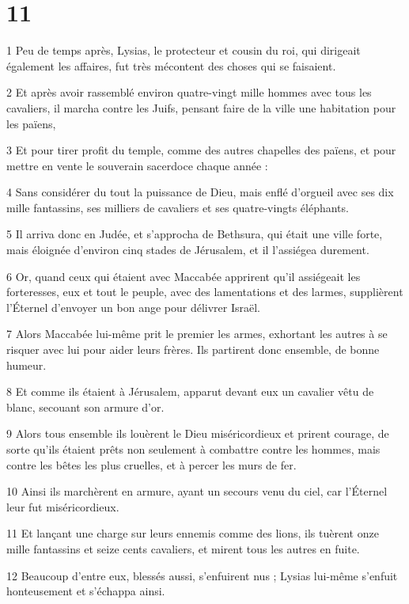 \chapter{11}

\par 1 Peu de temps après, Lysias, le protecteur et cousin du roi, qui dirigeait également les affaires, fut très mécontent des choses qui se faisaient.
\par 2 Et après avoir rassemblé environ quatre-vingt mille hommes avec tous les cavaliers, il marcha contre les Juifs, pensant faire de la ville une habitation pour les païens,
\par 3 Et pour tirer profit du temple, comme des autres chapelles des païens, et pour mettre en vente le souverain sacerdoce chaque année :
\par 4 Sans considérer du tout la puissance de Dieu, mais enflé d'orgueil avec ses dix mille fantassins, ses milliers de cavaliers et ses quatre-vingts éléphants.
\par 5 Il arriva donc en Judée, et s'approcha de Bethsura, qui était une ville forte, mais éloignée d'environ cinq stades de Jérusalem, et il l'assiégea durement.
\par 6 Or, quand ceux qui étaient avec Maccabée apprirent qu'il assiégeait les forteresses, eux et tout le peuple, avec des lamentations et des larmes, supplièrent l'Éternel d'envoyer un bon ange pour délivrer Israël.
\par 7 Alors Maccabée lui-même prit le premier les armes, exhortant les autres à se risquer avec lui pour aider leurs frères. Ils partirent donc ensemble, de bonne humeur.
\par 8 Et comme ils étaient à Jérusalem, apparut devant eux un cavalier vêtu de blanc, secouant son armure d'or.
\par 9 Alors tous ensemble ils louèrent le Dieu miséricordieux et prirent courage, de sorte qu'ils étaient prêts non seulement à combattre contre les hommes, mais contre les bêtes les plus cruelles, et à percer les murs de fer.
\par 10 Ainsi ils marchèrent en armure, ayant un secours venu du ciel, car l'Éternel leur fut miséricordieux.
\par 11 Et lançant une charge sur leurs ennemis comme des lions, ils tuèrent onze mille fantassins et seize cents cavaliers, et mirent tous les autres en fuite.
\par 12 Beaucoup d'entre eux, blessés aussi, s'enfuirent nus ; Lysias lui-même s'enfuit honteusement et s'échappa ainsi.
